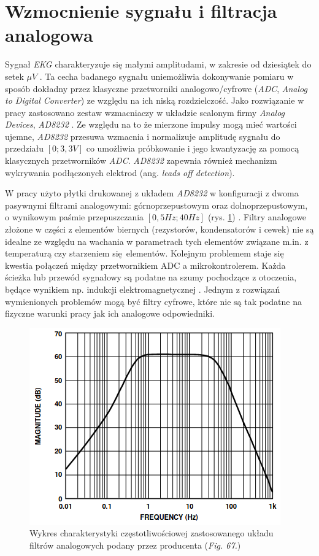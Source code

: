 \newpage

\section{Wzmocnienie sygnału i filtracja analogowa}

Sygnał \textit{EKG} charakteryzuje się małymi amplitudami, w zakresie od dziesiątek do setek $\mu V$ \cite{Zywietz1990}.
Ta cecha badanego sygnału uniemożliwia dokonywanie pomiaru w sposób dokładny przez klasyczne przetworniki analogowo/cyfrowe (\textit{ADC}, \textit{Analog to Digital Converter})
ze względu na ich niską rozdzielczość. Jako rozwiązanie w pracy zastosowano zestaw wzmacniaczy w układzie scalonym firmy \textit{Analog Devices}, \textit{AD8232} \cite{AD8232ds}. 
Ze względu na to że mierzone impulsy mogą mieć wartości ujemne, \textit{AD8232} przesuwa wzmacnia i normalizuje amplitudę sygnału do przedziału $[0; 3,3V]$ co umożliwia 
próbkowanie i jego kwantyzację za pomocą klasycznych przetworników \textit{ADC}. 
\textit{AD8232} zapewnia również mechanizm wykrywania podłączonych elektrod (ang. \textit{leads off detection}).


W pracy użyto płytki drukowanej z układem \textit{AD8232} \cite{AD8232BS} w konfiguracji z dwoma pasywnymi filtrami analogowymi: 
górnoprzepustowym oraz dolnoprzepustowym, o wynikowym paśmie przepuszczania $[0,5 Hz; 40Hz]$ (rys. \ref{fig:afilt}) \cite{AD8232ds}.
Filtry analogowe złożone w części z elementów biernych (rezystorów, kondensatorów i cewek) nie są idealne ze względu na wachania w 
parametrach tych elementów związane m.in. z temperaturą czy starzeniem się elementów. Kolejnym problemem staje się kwestia połączeń
między przetwornikiem ADC a mikrokontrolerem. Każda ścieżka lub przewód sygnałowy są podatne na szumy pochodzące z otoczenia, będące
wynikiem np. indukcji elektromagnetycznej \cite{EmcPhy2010}. Jednym z rozwiązań wymienionych problemów mogą być 
filtry cyfrowe, które nie są tak podatne na fizyczne warunki pracy jak ich analogowe odpowiedniki.

\begin{figure}[h!]
    \centering 
    \includegraphics[scale=0.75]{pl/media/afilt.png}
    \caption{Wykres charakterystyki częstotliwościowej zastosowanego układu filtrów analogowych podany przez producenta \cite{AD8232ds}(\textit{Fig. 67.})}
    \label{fig:afilt}
\end{figure}

